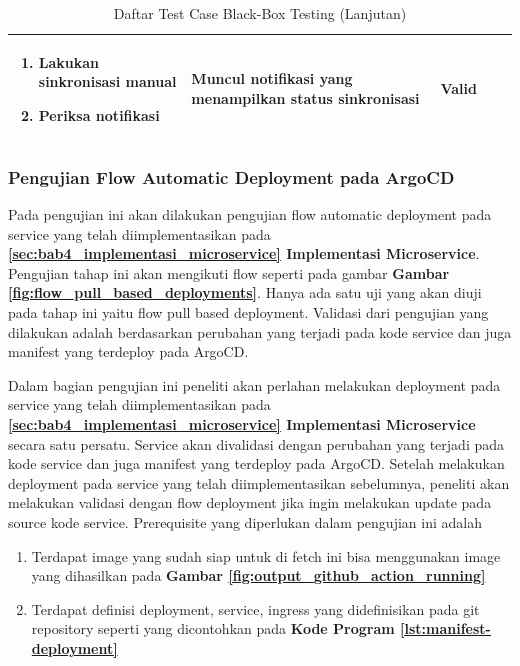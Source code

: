 \begin{table}[H]
\begin{adjustbox}{width=\textwidth}
\begin{tabular}{|p{0.8cm}|p{2.2cm}|p{4cm}|p{3.5cm}|p{1.2cm}|}
\begin{enumerate}[leftmargin=*,noitemsep,topsep=0pt,label=\arabic*.,widest=99]
                                                      \item Lakukan sinkronisasi manual
                                                      \item Periksa notifikasi
                                                    \end{enumerate}       & Muncul notifikasi yang menampilkan status sinkronisasi       & Valid                                                             \\ \hline
    \end{tabular}
  \end{adjustbox}
  \caption{Daftar Test Case Black-Box Testing (Lanjutan)}
  \label{tab:test-case-2}
\end{table}

\subsubsection{Pengujian Flow Automatic Deployment pada ArgoCD}
Pada pengujian ini akan dilakukan pengujian flow automatic deployment pada
service yang telah diimplementasikan pada
\textbf{\ref{sec:bab4_implementasi_microservice} Implementasi Microservice}.
Pengujian tahap ini akan mengikuti flow seperti pada gambar \textbf{Gambar
  \ref{fig:flow_pull_based_deployments}}. Hanya ada satu uji yang akan diuji pada
tahap ini yaitu flow pull based deployment. Validasi dari pengujian yang
dilakukan adalah berdasarkan perubahan yang terjadi pada kode service dan juga
manifest yang terdeploy pada ArgoCD.

Dalam bagian pengujian ini peneliti akan perlahan melakukan deployment pada
service yang telah diimplementasikan pada
\textbf{\ref{sec:bab4_implementasi_microservice} Implementasi Microservice}
secara satu persatu. Service akan divalidasi dengan perubahan yang terjadi pada
kode service dan juga manifest yang terdeploy pada ArgoCD. Setelah melakukan
deployment pada service yang telah diimplementasikan sebelumnya, peneliti akan
melakukan validasi dengan flow deployment jika ingin melakukan update pada
source kode service. Prerequisite yang diperlukan dalam pengujian ini adalah
\begin{enumerate}
  \item Terdapat image yang sudah siap untuk di fetch ini bisa menggunakan image yang
        dihasilkan pada \textbf{Gambar \ref{fig:output_github_action_running}}
  \item Terdapat definisi deployment, service, ingress yang didefinisikan pada git
        repository seperti yang dicontohkan pada \textbf{Kode Program
          \ref{lst:manifest-deployment}}
\end{enumerate}

